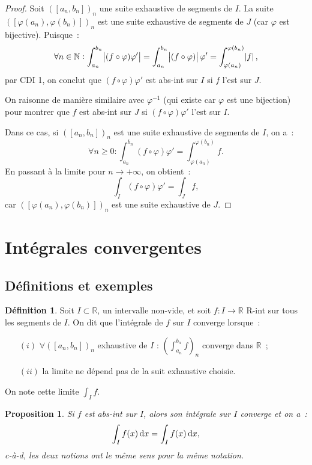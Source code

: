 \documentclass{report}
\newtheorem{prp}[thm]{Proposition}
\theoremstyle{definition}
\newtheorem{déf}[thm]{Définition}
\theoremstyle{remark}
\newcommand{\R}{\mathbb R}
\newcommand{\N}{\mathbb N}
\newcommand{\pinfty}{{+\infty}}
\newcommand{\CDII}{{CDI 1}}
\begin{document}
			\begin{proof} Soit $([a_n, b_n])_n$ une suite exhaustive de segments de $I$. La suite $([\varphi(a_n), \varphi(b_n)])_n$ est une suite exhaustive de
			segments de $J$ (car $\varphi$ est bijective). Puisque~:
			\[\forall n \in \N : \int_{a_n}^{b_n}\abs {(f \circ \varphi)\varphi'} = \int_{a_n}^{b_n}\abs {(f \circ \varphi)}\varphi'
				= \int_{\varphi(a_n)}^{\varphi(b_n)}\abs {f},\]
				par \CDII, on conclut que $(f \circ \varphi)\varphi'$ est abs-int sur $I$ si $f$ l'est sur $J$.

				On raisonne de manière similaire avec $\varphi^{-1}$ (qui existe car $\varphi$ est une bijection) pour montrer que $f$ est abs-int sur $J$ si
				$(f \circ \varphi)\varphi\prime$ l'est sur $I$.

				Dans ce cas, si $([a_n, b_n])_n$ est une suite exhaustive de segments de $I$, on a~:
				\[\forall n \geq 0 : \int_{a_n}^{b_n}(f \circ \varphi)\varphi\prime = \int_{\varphi(a_n)}^{\varphi(b_n)}f.\]
				En passant à la limite pour $n \to \pinfty$, on obtient~:
				\[\int_I(f \circ \varphi)\varphi\prime = \int_J f,\]
				car $([\varphi(a_n), \varphi(b_n)])_n$ est une suite exhaustive de $J$.
			\end{proof}

	\section{Intégrales convergentes}
		\subsection{Définitions et exemples}
			\begin{déf} Soit $I \subset \R$, un intervalle non-vide, et soit $f : I \to \R$ R-int sur tous les segments de $I$. On dit que l'intégrale de $f$ sur $I$
			converge lorsque~:
			\begin{itemize}
				\item[$(i)$]  $\forall ([a_n, b_n])_n$ exhaustive de $I$ : $\left(\int_{a_n}^{b_n}f\right)_n$ converge dans $\R$~;
				\item[$(ii)$] la limite ne dépend pas de la suit exhaustive choisie.
			\end{itemize}

			On note cette limite $\int_I f$.
			\end{déf}

			\begin{prp} Si $f$ est abs-int sur $I$, alors son intégrale sur $I$ converge et on a~:
			\[\int_I f(x)\dif x = \int_I f(x)\dif x,\]
			c-à-d, les deux notions ont le même sens pour la même notation.
			\end{prp}
\end{document}
